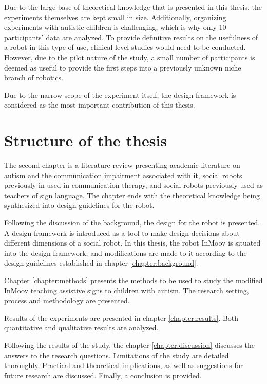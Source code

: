 Due to the large base of theoretical knowledge that is presented in this thesis, the experiments themselves are kept small in size. Additionally, organizing experiments with autistic children is challenging, which is why only 10 participants' data are analyzed. To provide definitive results on the usefulness of a robot in this type of use, clinical level studies would need to be conducted. However, due to the pilot nature of the study, a small number of participants is deemed as useful to provide the first steps into a previously unknown niche branch of robotics.

Due to the narrow scope of the experiment itself, the design framework is considered as the most important contribution of this thesis.



\section{Structure of the thesis}

The second chapter is a literature review presenting academic literature on autism and the communication impairment associated with it, social robots previously in used in communication therapy, and social robots previously used as teachers of sign language. The chapter ends with the theoretical knowledge being synthesized into design guidelines for the robot.

Following the discussion of the background, the design for the robot is presented. A design framework is introduced as a tool to make design decisions about different dimensions of a social robot. In this thesis, the robot InMoov is situated into the design framework, and modifications are made to it according to the design guidelines established in chapter \ref{chapter:background}.

Chapter \ref{chapter:methods} presents the methods to be used to study the modified InMoov teaching assistive signs to children with autism. The research setting, process and methodology are presented.

Results of the experiments are presented in chapter \ref{chapter:results}. Both quantitative and qualitative results are analyzed.

Following the results of the study, the chapter \ref{chapter:discussion} discusses the answers to the research questions. Limitations of the study are detailed thoroughly. Practical and theoretical implications, as well as suggestions for future research are discussed. Finally, a conclusion is provided.
